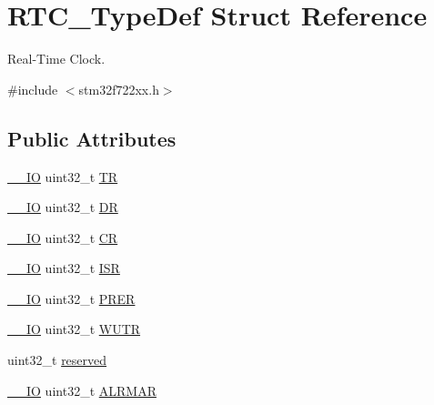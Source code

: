 \hypertarget{struct_r_t_c___type_def}{}\section{R\+T\+C\+\_\+\+Type\+Def Struct Reference}
\label{struct_r_t_c___type_def}


Real-\/\+Time Clock.  




{\ttfamily \#include $<$stm32f722xx.\+h$>$}

\subsection*{Public Attributes}
\begin{DoxyCompactItemize}
\item 
\mbox{\hyperlink{core__sc300_8h_aec43007d9998a0a0e01faede4133d6be}{\+\_\+\+\_\+\+IO}} uint32\+\_\+t \mbox{\hyperlink{struct_r_t_c___type_def_a2e8783857f8644a4eb80ebc51e1cba42}{TR}}
\item 
\mbox{\hyperlink{core__sc300_8h_aec43007d9998a0a0e01faede4133d6be}{\+\_\+\+\_\+\+IO}} uint32\+\_\+t \mbox{\hyperlink{struct_r_t_c___type_def_a8750eae683cb3d382476dc7cdcd92b96}{DR}}
\item 
\mbox{\hyperlink{core__sc300_8h_aec43007d9998a0a0e01faede4133d6be}{\+\_\+\+\_\+\+IO}} uint32\+\_\+t \mbox{\hyperlink{struct_r_t_c___type_def_a731d9209ce40dce6ea61fcc6f818c892}{CR}}
\item 
\mbox{\hyperlink{core__sc300_8h_aec43007d9998a0a0e01faede4133d6be}{\+\_\+\+\_\+\+IO}} uint32\+\_\+t \mbox{\hyperlink{struct_r_t_c___type_def_a5a7b104d80b48b5708b50cdc487d6a78}{I\+SR}}
\item 
\mbox{\hyperlink{core__sc300_8h_aec43007d9998a0a0e01faede4133d6be}{\+\_\+\+\_\+\+IO}} uint32\+\_\+t \mbox{\hyperlink{struct_r_t_c___type_def_a5f43a11e0873212f598e41db5f2dcf6a}{P\+R\+ER}}
\item 
\mbox{\hyperlink{core__sc300_8h_aec43007d9998a0a0e01faede4133d6be}{\+\_\+\+\_\+\+IO}} uint32\+\_\+t \mbox{\hyperlink{struct_r_t_c___type_def_ad93017bb0a778a2aad9cd71211fc770a}{W\+U\+TR}}
\item 
uint32\+\_\+t \mbox{\hyperlink{struct_r_t_c___type_def_a379f2d857bff7db82470fffaeca381bd}{reserved}}
\item 
\mbox{\hyperlink{core__sc300_8h_aec43007d9998a0a0e01faede4133d6be}{\+\_\+\+\_\+\+IO}} uint32\+\_\+t \mbox{\hyperlink{struct_r_t_c___type_def_ad7e54d5c5a4b9fd1e26aca85b1e36c7f}{A\+L\+R\+M\+AR}}
\item 

\end{DoxyCompactItemize}
